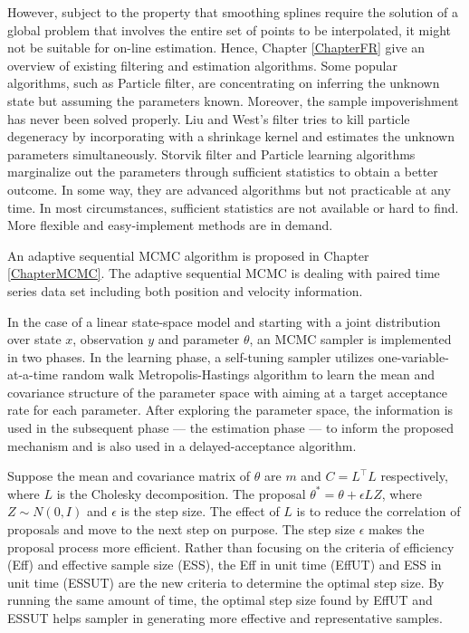 However, subject to the property that smoothing splines require the solution of a global problem that involves the entire set of points to be interpolated, it might not be suitable for on-line estimation. Hence, Chapter \ref{ChapterFR} give an overview of existing filtering and estimation algorithms. Some popular algorithms, such as Particle filter, are concentrating on inferring the unknown state but assuming the parameters known. Moreover, the sample impoverishment has never been solved properly. Liu and West's filter tries to kill particle degeneracy by incorporating with a shrinkage kernel and estimates the unknown parameters simultaneously. Storvik filter and Particle learning algorithms marginalize out the parameters through sufficient statistics to obtain a better outcome. In some way, they are advanced algorithms but not practicable at any time. In most circumstances, sufficient statistics are not available or hard to find. More flexible and easy-implement methods are in demand. 
 
An adaptive sequential MCMC algorithm is proposed in Chapter \ref{ChapterMCMC}. The adaptive sequential MCMC is dealing with paired time series data set including both position and velocity information. 

In the case of a linear state-space model and starting with a joint distribution over state $x$, observation $y$ and parameter $\theta$, an MCMC sampler is implemented in two phases. In the learning phase, a self-tuning sampler utilizes one-variable-at-a-time random walk Metropolis-Hastings algorithm to learn the mean and covariance structure of the parameter space with aiming at a target acceptance rate for each parameter. After exploring the parameter space, the information is used in the subsequent phase --- the estimation phase --- to inform the proposed mechanism and is also used in a delayed-acceptance algorithm. 

Suppose the mean and covariance matrix of $\theta$ are $m$ and $C=L^\top L$ respectively, where $L$ is the Cholesky decomposition. The proposal $\theta^*=\theta + \epsilon LZ$, where $Z\sim N(0,I)$ and $\epsilon$ is the step size. The effect of $L$ is to reduce the correlation of proposals and move to the next step on purpose. The step size $\epsilon$ makes the proposal process more efficient. Rather than focusing on the criteria of efficiency (Eff) and effective sample size (ESS), the Eff in unit time (EffUT) and ESS in unit time (ESSUT) are the new criteria to determine the optimal step size. By running the same amount of time, the optimal step size found by EffUT and ESSUT helps sampler in generating more effective and representative samples. 


